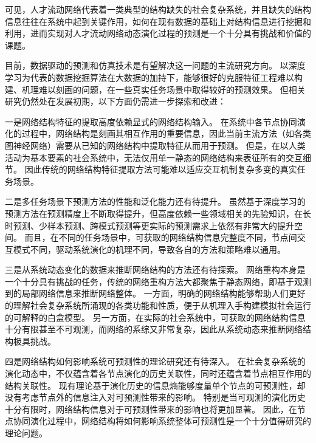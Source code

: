 可见，人才流动网络代表着一类典型的结构缺失的社会复杂系统，并且缺失的结构信息往往在系统中起到关键作用，如何在现有数据的基础上对结构信息进行挖掘和利用，进而实现对人才流动网络动态演化过程的预测是一个十分具有挑战和价值的课题。

目前，数据驱动的预测和仿真技术是有望解决这一问题的主流研究方向。
以深度学习为代表的数据挖掘算法在大数据的加持下，能够很好的克服特征工程难以构建、机理难以刻画的问题，在一些真实任务场景中取得较好的预测效果。
但相关研究仍然处在发展初期，以下方面仍需进一步探索和改进：

一是网络结构特征的提取高度依赖显式的网络结构输入。
在系统中各节点协同演化的过程中，网络结构是刻画其相互作用的重要信息，因此当前主流方法（如各类图神经网络）需要从已知的网络结构中提取特征从而用于预测。
但是，在以人类活动为基本要素的社会系统中，无法仅用单一静态的网络结构来表征所有的交互细节。
因此传统的网络结构特征提取方法可能难以适应交互机制复杂多变的真实任务场景。

二是多任务场景下预测方法的性能和泛化能力还有待提升。
虽然基于深度学习的预测方法在预测精度上不断取得提升，但高度依赖一些领域相关的先验知识，在长时预测、少样本预测、跨模式预测等更实际的预测需求上依然有非常大的提升空间。
而且，在不同的任务场景中，可获取的网络结构信息完整度不同，节点间交互模式不同，驱动系统演化的机理不同，导致各自的方法和策略难以通用。

三是从系统动态变化的数据来推断网络结构的方法还有待探索。
网络重构本身是一个十分具有挑战的任务，传统的网络重构方法大都聚焦于静态网络，即基于观测到的局部网络信息来推断网络整体。
一方面，明确的网络结构能够帮助人们更好的理解社会复杂系统所涌现的各类功能和性质，便于从机理入手构建模拟社会运行的可解释的白盒模型。
另一方面，在实际的社会系统中，可获取的网络结构信息十分有限甚至不可观测，而网络的系综又非常复杂，因此从系统动态来推断网络结构极具挑战。

四是网络结构如何影响系统可预测性的理论研究还有待深入。
在社会复杂系统的演化动态中，不仅蕴含着各节点演化的历史关联性，同时还蕴含着节点相互作用的结构关联性。
现有理论基于演化历史的信息熵能够度量单个节点的可预测性，却没有考虑节点外的信息注入对可预测性带来的影响。
特别是当可观测的演化历史十分有限时，网络结构信息对于可预测性带来的影响也将更加显著。
因此，在节点协同演化过程中，网络结构将如何影响系统整体可预测性是一个十分值得研究的理论问题。


